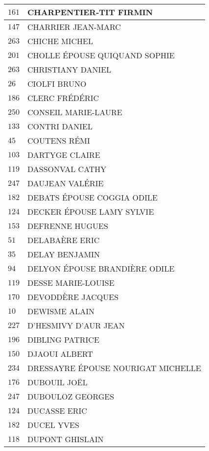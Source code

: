 \begin{xltabular}{\linewidth}{|l|X|}
    \hline
    $161$ & CHARPENTIER-TIT FIRMIN \\
    \hline
    $147$ & CHARRIER JEAN-MARC \\
    \hline
    $263$ & CHICHE MICHEL \\
    \hline
    $201$ & CHOLLE ÉPOUSE QUIQUAND SOPHIE \\
    \hline
    $263$ & CHRISTIANY DANIEL \\
    \hline
    $26$ & CIOLFI BRUNO \\
    \hline
    $186$ & CLERC FRÉDÉRIC \\
    \hline
    $250$ & CONSEIL MARIE-LAURE \\
    \hline
    $133$ & CONTRI DANIEL \\
    \hline
    $45$ & COUTENS RÉMI \\
    \hline
    $103$ & DARTYGE CLAIRE \\
    \hline
    $119$ & DASSONVAL CATHY \\
    \hline
    $247$ & DAUJEAN VALÉRIE \\
    \hline
    $182$ & DEBATS ÉPOUSE COGGIA ODILE \\
    \hline
    $124$ & DECKER ÉPOUSE LAMY SYLVIE \\
    \hline
    $153$ & DEFRENNE HUGUES \\
    \hline
    $51$ & DELABAÈRE ERIC \\
    \hline
    $35$ & DELAY BENJAMIN \\
    \hline
    $94$ & DELYON ÉPOUSE BRANDIÈRE ODILE \\
    \hline
    $119$ & DESSE MARIE-LOUISE \\
    \hline
    $170$ & DEVODDÈRE JACQUES \\
    \hline
    $10$ & DEWISME ALAIN \\
    \hline
    $227$ & D'HESMIVY D'AUR JEAN \\
    \hline
    $196$ & DIBLING PATRICE \\
    \hline
    $150$ & DJAOUI ALBERT \\
    \hline
    $234$ & DRESSAYRE ÉPOUSE NOURIGAT MICHELLE \\
    \hline
    $176$ & DUBOUIL JOËL \\
    \hline
    $247$ & DUBOULOZ GEORGES \\
    \hline
    $124$ & DUCASSE ERIC \\
    \hline
    $182$ & DUCEL YVES \\
    \hline
    $118$ & DUPONT GHISLAIN \\

\end{xltabular}

